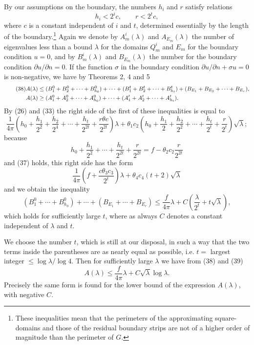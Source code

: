 By our assumptions on the boundary, the numbers $h_i$ and $r$ satisfy relations
\begin{equation}\tag{37}
h_i<2^ic,\qquad r<2^tc,
\end{equation}
where $c$ is a constant independent of $i$ and $t$, determined essentially by the length of the boundary.\footnote{These inequalities mean that the perimeters of the approximating square-domains and those of the residual boundary strips are not of a higher order of magnitude than the perimeter of $G$.}
Again we denote by $A_m^i(\lambda)$ and $A_{E_m}(\lambda)$ the number of eigenvalues less than a bound $\lambda$ for the domains $Q_m^i$ and $E_m$ for the boundary condition $u=0$, and by $B_m^i(\lambda)$ and $B_{E_m}(\lambda)$ the number for the boundary condition $\partial u/\partial n=0$. If the function $\sigma$ in the boundary condition $\partial u/\partial n+\sigma u=0$ is non-negative, we have by Theorems 2, 4 and 5
\begin{align}\tag{38}
A(\lambda)&\le(B_1^0+B_2^0+\cdots+B_{h_0}^0)+\cdots+(B_1^t+B_2^t+\cdots+B_{h_t}^t)
 +(B_{E_1}+B_{E_2}+\cdots+B_{E_r}),\notag\\
A(\lambda)&\ge(A_1^0+A_2^0+\cdots+A_{h_0}^0)+\cdots+(A_1^t+A_2^t+\cdots+A_{h_t}^t).
\end{align}
By (26) and (33) the right side of the first of these inequalities is equal to
\[
\frac1{4\pi}\left(h_0+\frac{h_1}{2^2}+\frac{h_2}{2^4}+\cdots+\frac{h_t}{2^{2t}}+\frac{r\theta c}{2^{2t}}\right)\lambda
+\theta_1c_2\left(h_0+\frac{h_1}{2}+\frac{h_2}{2^2}+\cdots+\frac{h_t}{2^t}+\frac r{2^t}\right)\sqrt\lambda;
\]
because
\[
h_0+\frac{h_1}{2^2}+\cdots+\frac{h_t}{2^{2t}}+\frac r{2^{2t}}
=f-\theta_2c_2\frac r{2^{2t}}
\]
and (37) holds, this right side has the form
\[
\frac1{4\pi}\left(f+\frac{c\theta_3c_3}{2^t}\right)\lambda
+\theta_4c_4(t+2)\sqrt\lambda
\]
and we obtain the inequality
\begin{equation}\tag{39}
(B_1^0+\cdots+B_{h_0}^0)+\cdots+(B_{E_1}+\cdots+B_{E_r})
\le\frac f{4\pi}\lambda+C\left(\frac\lambda{2^t}+t\sqrt\lambda\right),
\end{equation}
which holds for sufficiently large $t$, where as always $C$ denotes a constant independent of $\lambda$ and $t$.

We choose the number $t$, which is still at our disposal, in such a way that the two terms inside the parentheses are as nearly equal as possible, i.e. $t=$ largest integer $\le\log\lambda/\log4$. Then for sufficiently large $\lambda$ we have from (38) and (39)
\begin{equation}\tag{40}
A(\lambda)\le\frac f{4\pi}\lambda+C\sqrt\lambda\log\lambda.
\end{equation}
Precisely the same form is found for the lower bound of the expression $A(\lambda)$, with negative $C$.

